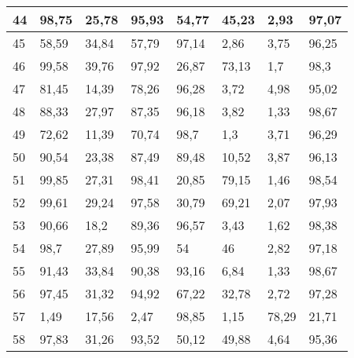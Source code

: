 \begin{longtable}[c]{|l|l|l|l|l|l|l|l|}
44              & 98,75        & 25,78        & 95,93       & 54,77         & 45,23         & 2,93          & 97,07         \\ \hline
45              & 58,59        & 34,84        & 57,79       & 97,14         & 2,86          & 3,75          & 96,25         \\ \hline
46              & 99,58        & 39,76        & 97,92       & 26,87         & 73,13         & 1,7           & 98,3          \\ \hline
47              & 81,45        & 14,39        & 78,26       & 96,28         & 3,72          & 4,98          & 95,02         \\ \hline
48              & 88,33        & 27,97        & 87,35       & 96,18         & 3,82          & 1,33          & 98,67         \\ \hline
49              & 72,62        & 11,39        & 70,74       & 98,7          & 1,3           & 3,71          & 96,29         \\ \hline
50              & 90,54        & 23,38        & 87,49       & 89,48         & 10,52         & 3,87          & 96,13         \\ \hline
51              & 99,85        & 27,31        & 98,41       & 20,85         & 79,15         & 1,46          & 98,54         \\ \hline
52              & 99,61        & 29,24        & 97,58       & 30,79         & 69,21         & 2,07          & 97,93         \\ \hline
53              & 90,66        & 18,2         & 89,36       & 96,57         & 3,43          & 1,62          & 98,38         \\ \hline
54              & 98,7         & 27,89        & 95,99       & 54            & 46            & 2,82          & 97,18         \\ \hline
55              & 91,43        & 33,84        & 90,38       & 93,16         & 6,84          & 1,33          & 98,67         \\ \hline
56              & 97,45        & 31,32        & 94,92       & 67,22         & 32,78         & 2,72          & 97,28         \\ \hline
57              & 1,49         & 17,56        & 2,47        & 98,85         & 1,15          & 78,29         & 21,71         \\ \hline
58              & 97,83        & 31,26        & 93,52       & 50,12         & 49,88         & 4,64          & 95,36         \\ \hline

\end{longtable}
